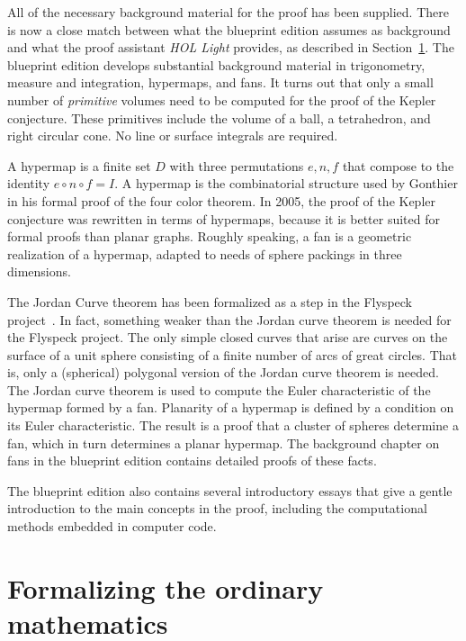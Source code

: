 \documentclass[11pt]{amsart}
\begin{document}
All of the necessary background material for the proof has been supplied.  There is now a close
match between what the blueprint edition assumes as background and what the proof assistant {\it HOL Light}
provides, as described in Section~\ref{sec:ordinary}.  The blueprint edition develops 
substantial background
material in trigonometry, measure and integration, hypermaps, and fans.   It turns out
that only a small number of {\it primitive} volumes need to be computed for the proof of the Kepler
conjecture. These primitives include the volume of a ball, a tetrahedron, and right circular cone.  
No line or surface integrals are required.

A hypermap is a finite set $D$ with three permutations $e,n,f$ that compose to the identity $e\circ n\circ f= I$.  A hypermap is the
combinatorial structure used by Gonthier in his formal proof of the four color theorem.  In 2005,
the proof of the Kepler conjecture was rewritten in terms of hypermaps, because it is better suited
for formal proofs than planar graphs.  Roughly speaking, a fan is a geometric realization of a hypermap,
adapted to needs of sphere packings in three dimensions.

The Jordan Curve theorem has been formalized as a step in the Flyspeck project~\cite{Hales:2007:jordan}.  In fact, something weaker than the Jordan curve theorem
is needed for the Flyspeck project.  The only simple closed curves that arise are curves on
the surface of a unit sphere consisting of a finite number of arcs of great circles.  That is,
only a (spherical) polygonal version of the Jordan curve theorem is needed.  The Jordan curve
theorem is used to compute the Euler characteristic of the hypermap formed by a fan.  Planarity of a hypermap is defined by a condition on its Euler characteristic.  The result is a proof that a cluster of spheres determine a fan, which in turn determines a planar hypermap.
The background chapter on fans in the blueprint edition contains detailed proofs of these facts.


The blueprint edition also contains several introductory essays that give a gentle introduction
to the main concepts in the proof, including the computational methods embedded in computer code.




\section{Formalizing the ordinary mathematics}
\label{sec:ordinary}
\end{document}
